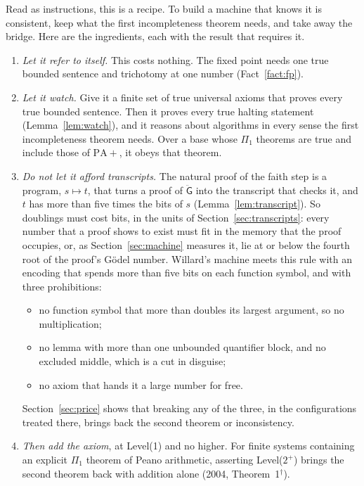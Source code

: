 \documentclass[11pt]{article}
\newcommand{\G}{\ddot{\mathsf{G}}}          %
\newcommand{\sk}{\ensuremath{^\dagger}}    %
\theoremstyle{plain}
\theoremstyle{definition}
\begin{document}
Read as instructions, this is a recipe. To build a machine that knows it is
consistent, keep what the first incompleteness theorem needs, and take away
the bridge. Here are the ingredients, each with the result that requires it.
\begin{enumerate}[label=\arabic*., leftmargin=2em, itemsep=2pt]
\item \emph{Let it refer to itself.} This costs nothing. The fixed point
  needs one true bounded sentence and trichotomy at one number
  (Fact~\ref{fact:fp}).
\item \emph{Let it watch.} Give it a finite set of true universal axioms
  that proves every true bounded sentence. Then it proves every true halting
  statement (Lemma~\ref{lem:watch}), and it reasons about algorithms in
  every sense the first incompleteness theorem needs. Over a base whose
  $\Pi_1$ theorems are true and include those of $\mathrm{PA}{+}$, it obeys
  that theorem.
\item \emph{Do not let it afford transcripts.} The natural proof of the
  faith step is a program, $s \mapsto t$, that turns a proof of $\G$ into
  the transcript that checks it, and $t$ has more than five times the bits
  of $s$ (Lemma~\ref{lem:transcript}). So doublings must cost bits, in the
  units of Section~\ref{sec:transcripts}: every number that a proof shows to
  exist must fit in the memory that the proof occupies, or, as
  Section~\ref{sec:machine} measures it, lie at or below the fourth root of
  the proof's Gödel number. Willard's machine meets this rule with an
  encoding that spends more than five bits on each function symbol, and
  with three prohibitions:
  \begin{itemize}[leftmargin=1.2em, itemsep=0pt, topsep=1pt]
  \item no function symbol that more than doubles its largest argument, so
    no multiplication;
  \item no lemma with more than one unbounded quantifier block, and no
    excluded middle, which is a cut in disguise;
  \item no axiom that hands it a large number for free.
  \end{itemize}
  Section~\ref{sec:price} shows that breaking any of the three, in the
  configurations treated there, brings back the second theorem or
  inconsistency.
\item \emph{Then add the axiom}, at Level(1) and no higher. For finite
  systems containing an explicit $\Pi_1$ theorem of Peano arithmetic,
  asserting Level($2^+$) brings the second theorem back with addition alone
  (2004, Theorem~1\sk).
\end{enumerate}
\end{document}

